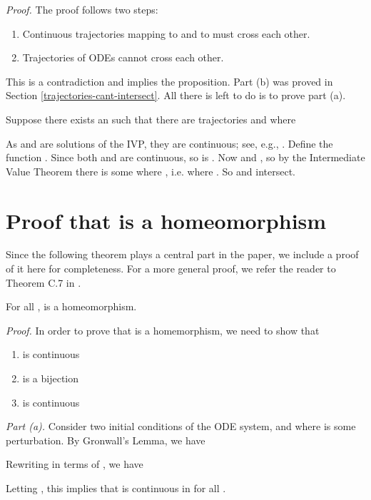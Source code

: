\documentclass{article}
\begin{document}
\textit{Proof.} The proof follows two steps: 
    \begin{enumerate}[label=(\alph*)]
        \item Continuous trajectories mapping  to  and  to  must cross each other. 
        \item Trajectories of ODEs cannot cross each other.
    \end{enumerate}
This is a contradiction and implies the proposition. Part (b) was proved in Section \ref{trajectories-cant-intersect}. All there is left to do is to prove part (a).

Suppose there exists an  such that there are trajectories  and  where

As  and  are solutions of the IVP, they are continuous; see, e.g., \cite{coddington1955theory}. Define the function . Since both  and  are continuous, so is . Now  and , so by the Intermediate Value Theorem there is some  where , i.e. where . So  and  intersect.

\section{Proof that  is a homeomorphism}

Since the following theorem plays a central part in the paper, we include a proof of it here for completeness. For a more general proof, we refer the reader to Theorem C.7 in \cite{younes2010shapes}.

\begin{theorem*} For all ,  is a homeomorphism.
\end{theorem*}

\textit{Proof.} In order to prove that  is a homemorphism, we need to show that

\begin{enumerate}[label=(\alph*)]
    \item  is continuous
    \item  is a bijection
    \item  is continuous
\end{enumerate}

\textit{Part (a).} Consider two initial conditions of the ODE system,  and  where  is some perturbation. By Gronwall's Lemma, we have



Rewriting in terms of , we have



Letting , this implies that  is continuous in  for all .
\end{document}
